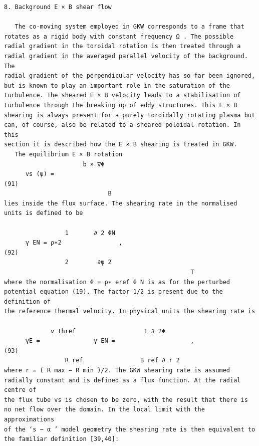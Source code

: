 \documentclass[a4paper]{article}
\newcommand{\gkwpagefont}{\fontsize{6.0pt}{7.55pt}\selectfont}
\begin{document}
\begin{Verbatim}[fontsize=\gkwpagefont]
8. Background E × B shear flow

   The co-moving system employed in GKW corresponds to a frame that rotates as a rigid body with constant frequency Ω . The possible
radial gradient in the toroidal rotation is then treated through a radial gradient in the averaged parallel velocity of the background. The
radial gradient of the perpendicular velocity has so far been ignored, but is known to play an important role in the saturation of the
turbulence. The sheared E × B velocity leads to a stabilisation of turbulence through the breaking up of eddy structures. This E × B
shearing is always present for a purely toroidally rotating plasma but can, of course, also be related to a sheared poloidal rotation. In this
section it is described how the E × B shearing is treated in GKW.
   The equilibrium E × B rotation
                      b × ∇Φ
      vs (ψ) =                                                                                                                               (91)
                             B
lies inside the flux surface. The shearing rate in the normalised units is defined to be

                 1       ∂ 2 ΦN
      γ EN = ρ∗2                ,                                                                                                            (92)
                 2        ∂ψ 2
                                                    T
where the normalisation Φ = ρ∗ eref Φ N is as for the perturbed potential equation (19). The factor 1/2 is present due to the definition of
the reference thermal velocity. In physical units the shearing rate is

             v thref                   1 ∂ 2Φ
      γE =               γ EN =                     ,                                                                                        (93)
                 R ref                B ref ∂ r 2
where r = ( R max − R min )/2. The GKW shearing rate is assumed radially constant and is defined as a flux function. At the radial centre of
the flux tube vs is chosen to be zero, with the result that there is no net flow over the domain. In the local limit with the approximations
of the ‘s − α ’ model geometry the shearing rate is then equivalent to the familiar definition [39,40]:


\end{Verbatim}
\end{document}
